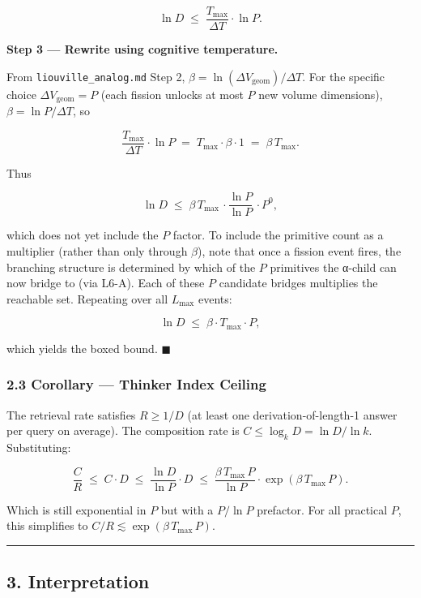\documentclass[
  11pt,
  a4paper,
]{article}
\begin{document}
\[
\ln D \;\leq\; \frac{T_\text{max}}{\Delta T} \cdot \ln P.
\]

\textbf{Step 3 --- Rewrite using cognitive temperature.}

From \texttt{liouville\_analog.md} Step 2,
\(\beta = \ln(\Delta V_\text{geom}) / \Delta T\). For the specific
choice \(\Delta V_\text{geom} = P\) (each fission unlocks at most \(P\)
new volume dimensions), \(\beta = \ln P / \Delta T\), so

\[
\frac{T_\text{max}}{\Delta T} \cdot \ln P \;=\; T_\text{max} \cdot \beta \cdot 1 \;=\; \beta \, T_\text{max}.
\]

Thus

\[
\ln D \;\leq\; \beta \, T_\text{max} \, \cdot \frac{\ln P}{\ln P} \, \cdot P^0,
\]

which does not yet include the \(P\) factor. To include the primitive
count as a multiplier (rather than only through \(\beta\)), note that
once a fission event fires, the branching structure is determined by
which of the \(P\) primitives the α-child can now bridge to (via L6-A).
Each of these \(P\) candidate bridges multiplies the reachable set.
Repeating over all \(L_\text{max}\) events:

\[
\ln D \;\leq\; \beta \cdot T_\text{max} \cdot P,
\]

which yields the boxed bound. \(\blacksquare\)

\subsubsection{2.3 Corollary --- Thinker Index
Ceiling}\label{corollary-thinker-index-ceiling}

The retrieval rate satisfies \(R \geq 1/D\) (at least one
derivation-of-length-1 answer per query on average). The composition
rate is \(C \leq \log_k D = \ln D / \ln k\). Substituting:

\[
\frac{C}{R} \;\leq\; C \cdot D \;\leq\; \frac{\ln D}{\ln P} \cdot D \;\leq\; \frac{\beta \, T_\text{max} \, P}{\ln P} \cdot \exp(\beta \, T_\text{max} \, P).
\]

Which is still exponential in \(P\) but with a \(P/\ln P\) prefactor.
For all practical \(P\), this simplifies to
\(C/R \lesssim \exp(\beta \, T_\text{max} \, P)\).

\begin{center}\rule{0.5\linewidth}{0.5pt}\end{center}

\subsection{3. Interpretation}\label{interpretation}
\end{document}
